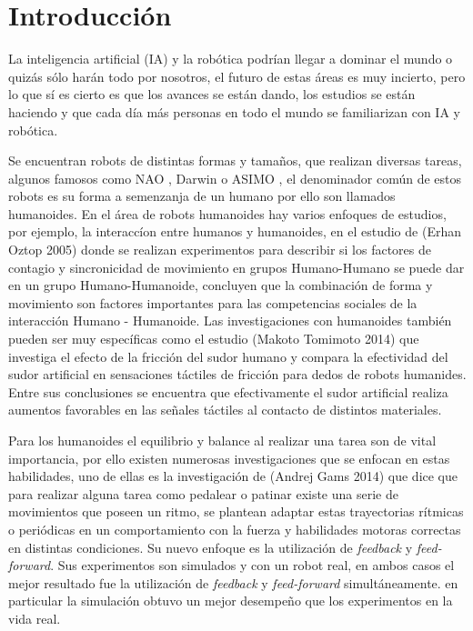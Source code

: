 
\chapter{Introducción}\label{intro}


\label{sect:justificacion}

La inteligencia artificial (IA) y la rob\'otica podr\'ian llegar a dominar el mundo o quiz\'as s\'olo har\'an todo por nosotros, el futuro de estas \'areas es muy incierto, pero lo que sí es cierto es que los avances se est\'an dando, los estudios se est\'an haciendo y que cada d\'ia m\'as personas en todo el mundo se familiarizan con IA y rob\'otica.

Se encuentran robots de distintas formas y tama\~nos, que realizan diversas tareas, algunos famosos como NAO \cite{nao}, Darwin \cite{darwin} o  ASIMO \cite{asimo}, el denominador com\'un de estos robots es su forma a semenzanja de un humano por ello son llamados humanoides. En el \'area de robots humanoides hay varios enfoques de estudios, por ejemplo, la interacc\'ion entre humanos y humanoides, en el estudio de (Erhan Oztop 2005) \cite{interacion} donde se realizan experimentos para describir si los factores de contagio y sincronicidad de movimiento en grupos Humano-Humano se puede dar en un grupo Humano-Humanoide, concluyen que la combinaci\'on de forma y movimiento son factores importantes para las competencias sociales de la interacci\'on Humano - Humanoide. 
Las investigaciones con humanoides tambi\'en pueden ser muy espec\'ificas como el estudio (Makoto Tomimoto 2014)\cite{sudor} que investiga el efecto de la fricci\'on del sudor humano y compara la efectividad del sudor artificial en sensaciones t\'actiles de fricci\'on para dedos de robots humanides. Entre sus conclusiones se encuentra que efectivamente el sudor artificial realiza aumentos favorables en las se\~nales t\'actiles al contacto de distintos materiales.

Para los humanoides el equilibrio y balance al realizar una tarea son de vital importancia, por ello existen numerosas investigaciones que se enfocan en estas habilidades, uno de ellas es la investigaci\'on de (Andrej Gams 2014) \cite{pedal} que dice que para realizar alguna tarea como pedalear o patinar existe una serie de movimientos que poseen un ritmo, se plantean adaptar estas trayectorias r\'itmicas o peri\'odicas en un comportamiento con la fuerza y habilidades motoras correctas en distintas condiciones. Su nuevo enfoque es la utilizaci\'on de \textit{feedback} y \textit{feed-forward}. Sus experimentos son simulados y con un robot real, en ambos casos el mejor resultado fue la utilizaci\'on de \textit{feedback} y \textit{feed-forward} simult\'aneamente. en particular la simulaci\'on obtuvo un mejor desempe\~no que los experimentos en la vida real.

